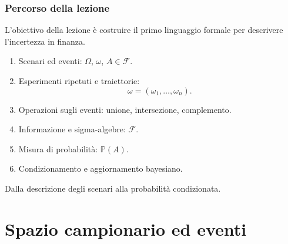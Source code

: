 \documentclass[handout]{beamer}%
\newenvironment{stepenumerate}{\begin{enumerate}[<+->]}{\end{enumerate}}
\providecommand{\Prob}{\mathbb{P}}
\providecommand{\F}{\mathcal{F}}
\providecommand{\1}{\mathbf{1}}
\providecommand{\QTR}[2]{\csname #1\endcsname{#2}}
\begin{document}
\begin{frame}%
%

\frametitle{Percorso della lezione}%
%

%


L'obiettivo della lezione \`{e} costruire il primo linguaggio formale per
descrivere l'incertezza in finanza.

\medskip

\begin{stepenumerate}
\item[1.] Scenari ed eventi: $\Omega$, $\omega$, $A\in\F$.

\item[2.] Esperimenti ripetuti e traiettorie:
\[
\omega=(\omega_{1},\ldots,\omega_{n}).
\]


\item[3.] Operazioni sugli eventi: unione, intersezione, complemento.

\item[4.] Informazione e sigma-algebre: $\F$.

\item[5.] Misura di probabilit\`{a}: $\Prob(A)$.

\item[6.] Condizionamento e aggiornamento bayesiano.
\end{stepenumerate}

\medskip

\begin{center}
{\small Dalla descrizione degli scenari alla probabilit\`{a} condizionata.}
\end{center}%

\transboxout
\end{frame}%




\section{Spazio campionario ed eventi}
\end{document}
